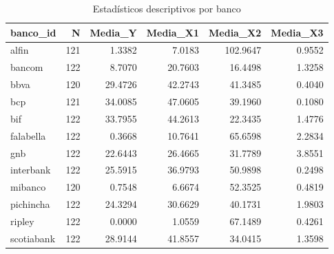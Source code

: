 \begin{table}
\caption{Estadísticos descriptivos por banco}
\label{tab:descriptivos_banco}
\begin{tabular}{lrrrrr}
\toprule
banco\_id & N & Media\_Y & Media\_X1 & Media\_X2 & Media\_X3 \\
\midrule
alfin & 121 & 1.3382 & 7.0183 & 102.9647 & 0.9552 \\
bancom & 122 & 8.7070 & 20.7603 & 16.4498 & 1.3258 \\
bbva & 120 & 29.4726 & 42.2743 & 41.3485 & 0.4040 \\
bcp & 121 & 34.0085 & 47.0605 & 39.1960 & 0.1080 \\
bif & 122 & 33.7955 & 44.2613 & 22.3435 & 1.4776 \\
falabella & 122 & 0.3668 & 10.7641 & 65.6598 & 2.2834 \\
gnb & 122 & 22.6443 & 26.4665 & 31.7789 & 3.8551 \\
interbank & 122 & 25.5915 & 36.9793 & 50.9898 & 0.2498 \\
mibanco & 120 & 0.7548 & 6.6674 & 52.3525 & 0.4819 \\
pichincha & 122 & 24.3294 & 30.6629 & 40.1731 & 1.9803 \\
ripley & 122 & 0.0000 & 1.0559 & 67.1489 & 0.4261 \\
scotiabank & 122 & 28.9144 & 41.8557 & 34.0415 & 1.3598 \\
\bottomrule
\end{tabular}
\end{table}
